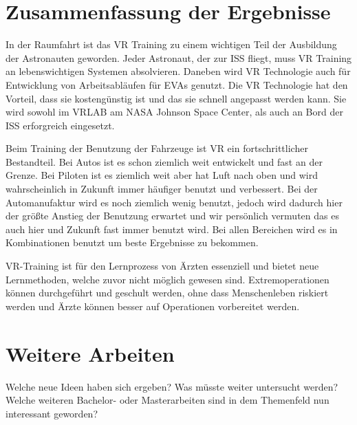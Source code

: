 \section{Zusammenfassung der Ergebnisse}
In der Raumfahrt ist das VR Training zu einem wichtigen Teil der Ausbildung der Astronauten geworden.
Jeder Astronaut, der zur ISS fliegt, muss VR Training an lebenswichtigen Systemen absolvieren. Daneben wird VR Technologie auch für Entwicklung von Arbeitsabläufen für EVAs genutzt.
Die VR Technologie hat den Vorteil, dass sie kostengünstig ist und das sie schnell angepasst werden kann. Sie wird sowohl im VRLAB am NASA Johnson Space Center, als auch an Bord der ISS erforgreich eingesetzt.

Beim Training der Benutzung der Fahrzeuge ist VR ein fortschrittlicher Bestandteil.
Bei Autos ist es schon ziemlich weit entwickelt und fast an der Grenze. Bei Piloten ist es ziemlich weit aber hat Luft nach oben und wird wahrscheinlich in Zukunft immer häufiger benutzt und verbessert.
Bei der Automanufaktur wird es noch ziemlich wenig benutzt, jedoch wird dadurch hier der größte Anstieg der Benutzung erwartet und wir persönlich vermuten das es auch hier und Zukunft fast immer benutzt wird.
Bei allen Bereichen wird es in Kombinationen benutzt um beste Ergebnisse zu bekommen.

VR-Training ist für den Lernprozess von Ärzten essenziell und bietet neue Lernmethoden, welche zuvor nicht möglich gewesen sind. Extremoperationen können durchgeführt und geschult werden, ohne dass Menschenleben riskiert werden und Ärzte können besser auf Operationen vorbereitet werden.
\section{Weitere Arbeiten}
Welche neue Ideen haben sich ergeben?
Was müsste weiter untersucht werden?
Welche weiteren Bachelor- oder Masterarbeiten sind in dem Themenfeld nun interessant geworden?
